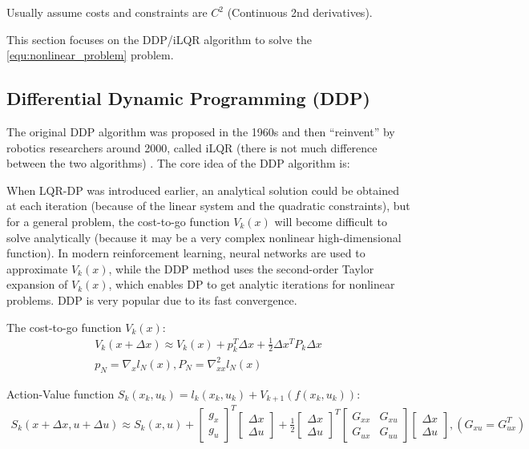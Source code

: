 Usually assume costs and constraints are $C^2$ (Continuous 2nd derivatives).

This section focuses on the DDP/iLQR algorithm to solve the \eqref{equ:nonlinear_problem} problem.

\subsection{Differential Dynamic Programming (DDP)}

The original DDP algorithm was proposed in the 1960s and then ``reinvent'' by robotics researchers around 2000, called iLQR (there is not much difference between the two algorithms) . The core idea of the DDP algorithm is:

When LQR-DP was introduced earlier, an analytical solution could be obtained at each iteration (because of the linear system and the quadratic constraints), but for a general problem, the cost-to-go function $V_k(x)$ will become difficult to solve analytically (because it may be a very complex nonlinear high-dimensional function). In modern reinforcement learning, neural networks are used to approximate $V_k(x)$, while the DDP method uses the second-order Taylor expansion of $V_k(x)$, which enables DP to get analytic iterations for nonlinear problems. DDP is very popular due to its fast convergence.

The cost-to-go function $V_k(x)$:
\begin{equation}
    \begin{aligned}
        V_k(x + \Delta x) \approx V_k(x) + p_k^T \Delta x + \frac{1}{2}\Delta x^T P_k \Delta x \\
        p_N = \nabla_x l_N(x), P_N = \nabla_{xx}^2 l_N(x)
    \end{aligned}
    \label{equ:ddp_v}
\end{equation}

Action-Value function $S_k(x_k,u_k)=l_k(x_k,u_k)+V_{k+1}(f(x_k,u_k))$:
\begin{equation}
    \begin{aligned}     S_k(x + \Delta x, u + \Delta u) \approx S_k(x, u) +     \begin{bmatrix}         g_x \\ g_u     \end{bmatrix}^T     \begin{bmatrix}         \Delta x \\ \Delta u     \end{bmatrix} +     \frac{1}{2}      \begin{bmatrix}         \Delta x \\ \Delta u     \end{bmatrix}^T     \begin{bmatrix}         G_{xx} & G_{xu} \\         G_{ux} & G_{uu}     \end{bmatrix}     \begin{bmatrix}         \Delta x \\ \Delta u     \end{bmatrix} ,(G_{xu} = G_{ux}^T) \end{aligned}
\end{equation}


